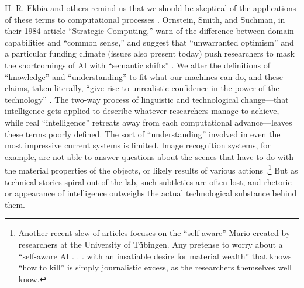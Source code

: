 H. R. Ekbia and others remind us that we should be skeptical of the
applications of these terms to computational processes \cite{ekbia}.
Ornstein, Smith, and Suchman, in their 1984 
article ``Strategic Computing,'' warn of the difference between domain
capabilities and ``common sense,'' and suggest that ``unwarranted
optimism'' and a particular funding climate (issues also present today)
push researchers to mask the shortcomings of AI with ``semantic
shifts'' \cite[p. 14]{ornstein}. We alter the definitions of ``knowledge'' and ``understanding''
to fit what our machines can do, and these claims, taken literally,
``give rise to unrealistic confidence in the power of the
technology'' \cite[p. 15]{ornstein}.
The two-way process of linguistic and technological change---that
intelligence gets applied to describe whatever researchers manage to
achieve, while real ``intelligence'' retreats away from each
computational advance---leaves these terms poorly defined. The sort of ``understanding''
involved in even the most impressive current systems is limited. Image
recognition systems, for example, are not
able to answer questions about the scenes that have to do with
the material properties of the objects, or likely results of various
actions \cite{gomesJordan}.\footnote{Another recent slew of articles focuses on
the ``self-aware'' Mario created by researchers at the University of
T\"{u}bingen. Any pretense to worry about a ``self-aware AI . . . with
an insatiable desire for material wealth'' that knows ``how to kill'' \cite{vincentMario}
is simply journalistic excess, as the
  researchers themselves well know.} But as technical stories spiral out of the
lab, such subtleties are often lost, and rhetoric or appearance of
intelligence outweighs the actual technological substance behind them.



